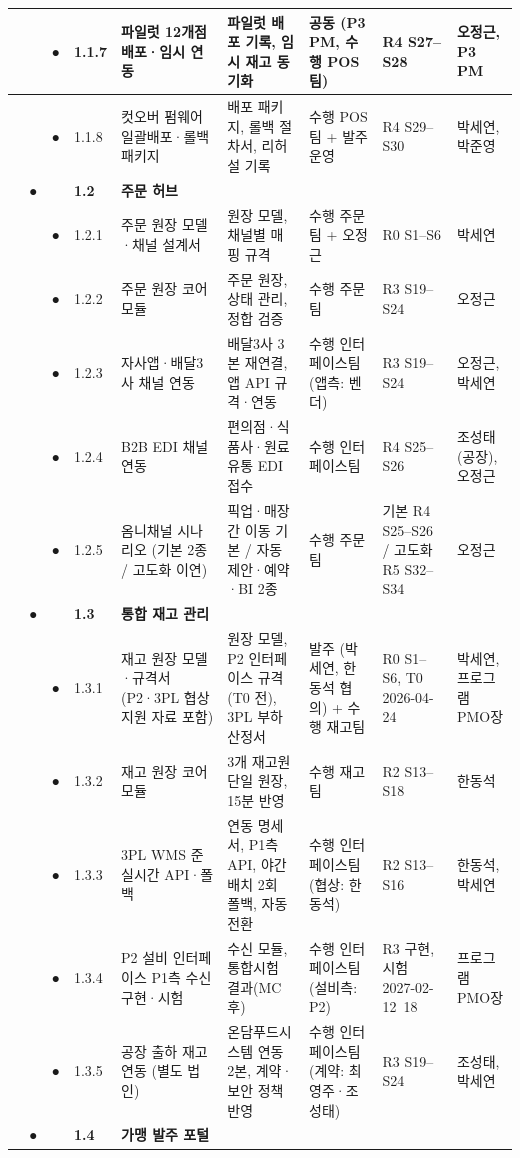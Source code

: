 \documentclass[10pt,a4paper]{article}
\begin{document}
{\begin{longtable}{|C{7mm}|C{7mm}|C{7mm}|L{12mm}|L{52mm}|L{52mm}|L{44mm}|L{30mm}|L{28mm}|}
& & ● & 1.1.7 & 파일럿 12개점 배포·임시 연동 & 파일럿 배포 기록, 임시 재고 동기화 & 공동 (P3 PM, 수행 POS팀) & R4 S27–S28 & 오정근, P3 PM \\ \hline
& & ● & 1.1.8 & 컷오버 펌웨어 일괄배포·롤백 패키지 & 배포 패키지, 롤백 절차서, 리허설 기록 & 수행 POS팀 + 발주 운영 & R4 S29–S30 & 박세연, 박준영 \\ \hline
& ● & & \textbf{1.2} & \textbf{주문 허브} & & & & \\ \hline
& & ● & 1.2.1 & 주문 원장 모델·채널 설계서 & 원장 모델, 채널별 매핑 규격 & 수행 주문팀 + 오정근 & R0 S1–S6 & 박세연 \\ \hline
& & ● & 1.2.2 & 주문 원장 코어 모듈 & 주문 원장, 상태 관리, 정합 검증 & 수행 주문팀 & R3 S19–S24 & 오정근 \\ \hline
& & ● & 1.2.3 & 자사앱·배달3사 채널 연동 & 배달3사 3본 재연결, 앱 API 규격·연동 & 수행 인터페이스팀 (앱측: 벤더) & R3 S19–S24 & 오정근, 박세연 \\ \hline
& & ● & 1.2.4 & B2B EDI 채널 연동 & 편의점·식품사·원료유통 EDI 접수 & 수행 인터페이스팀 & R4 S25–S26 & 조성태(공장), 오정근 \\ \hline
& & ● & 1.2.5 & 옴니채널 시나리오 (기본 2종 / 고도화 이연) & 픽업·매장 간 이동 기본 / 자동 제안·예약·BI 2종 & 수행 주문팀 & 기본 R4 S25–S26 / 고도화 R5 S32–S34 & 오정근 \\ \hline
& ● & & \textbf{1.3} & \textbf{통합 재고 관리} & & & & \\ \hline
& & ● & 1.3.1 & 재고 원장 모델·규격서 (P2·3PL 협상 지원 자료 포함) & 원장 모델, P2 인터페이스 규격(T0 전), 3PL 부하 산정서 & 발주 (박세연, 한동석 협의) + 수행 재고팀 & R0 S1–S6, T0 2026-04-24 & 박세연, 프로그램 PMO장 \\ \hline
& & ● & 1.3.2 & 재고 원장 코어 모듈 & 3개 재고원 단일 원장, 15분 반영 & 수행 재고팀 & R2 S13–S18 & 한동석 \\ \hline
& & ● & 1.3.3 & 3PL WMS 준실시간 API·폴백 & 연동 명세서, P1측 API, 야간 배치 2회 폴백, 자동 전환 & 수행 인터페이스팀 (협상: 한동석) & R2 S13–S16 & 한동석, 박세연 \\ \hline
& & ● & 1.3.4 & P2 설비 인터페이스 P1측 수신 구현·시험 & 수신 모듈, 통합시험 결과(MC 후) & 수행 인터페이스팀 (설비측: P2) & R3 구현, 시험 2027-02-12~18 & 프로그램 PMO장 \\ \hline
& & ● & 1.3.5 & 공장 출하 재고 연동 (별도 법인) & 온담푸드시스템 연동 2본, 계약·보안 정책 반영 & 수행 인터페이스팀 (계약: 최영주·조성태) & R3 S19–S24 & 조성태, 박세연 \\ \hline
& ● & & \textbf{1.4} & \textbf{가맹 발주 포털} & & & & \\ \hline

\end{longtable}}
\end{document}
